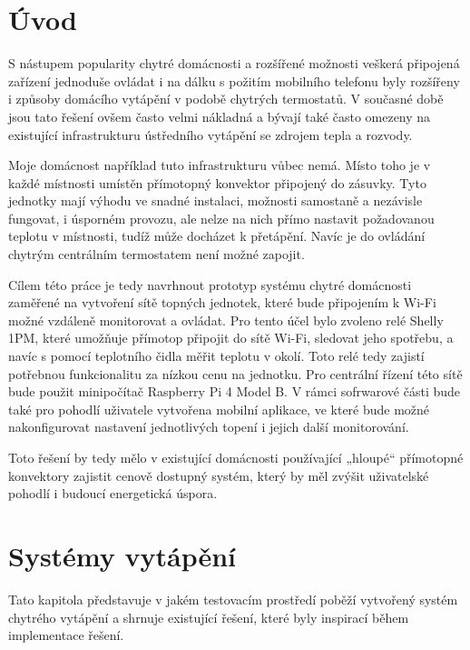 \chapter{Úvod}

S nástupem popularity chytré domácnosti a rozšířené možnosti veškerá připojená zařízení jednoduše ovládat i na dálku s požitím mobilního telefonu byly rozšířeny i způsoby domácího vytápění v podobě chytrých termostatů. V současné době jsou tato řešení ovšem často velmi nákladná a bývají také často omezeny na existující infrastrukturu ústředního vytápění se zdrojem tepla a rozvody.

Moje domácnost například tuto infrastrukturu vůbec nemá. Místo toho je v každé místnosti umístěn přímotopný konvektor připojený do zásuvky. Tyto jednotky mají výhodu ve snadné instalaci, možnosti samostaně a nezávisle fungovat, i úsporném provozu, ale nelze na nich přímo nastavit požadovanou teplotu v místnosti, tudíž může docházet k přetápění. Navíc je do ovládání chytrým centrálním termostatem není možné zapojit.

Cílem této práce je tedy navrhnout prototyp systému chytré domácnosti zaměřené na vytvoření sítě topných jednotek, které bude připojením k Wi-Fi možné vzdáleně monitorovat a ovládat. Pro tento účel bylo zvoleno relé Shelly 1PM, které umožňuje přímotop připojit do sítě Wi-Fi, sledovat jeho spotřebu, a navíc s pomocí teplotního čidla měřit teplotu v okolí. Toto relé tedy zajistí potřebnou funkcionalitu za nízkou cenu na jednotku. Pro centrální řízení této sítě bude použit minipočítač Raspberry Pi 4 Model B. V rámci sofrwarové části bude také pro pohodlí uživatele vytvořena mobilní aplikace, ve které bude možné nakonfigurovat nastavení jednotlivých topení i jejich další monitorování.

Toto řešení by tedy mělo v existující domácnosti používající „hloupé“ přímotopné konvektory zajistit cenově dostupný systém, který by měl zvýšit uživatelské pohodlí i budoucí energetická úspora.

\chapter{Systémy vytápění}
\label{teorie}
Tato kapitola představuje v jakém testovacím prostředí poběží vytvořený systém chytrého vytápění a shrnuje existující řešení, které byly inspirací během implementace řešení.

